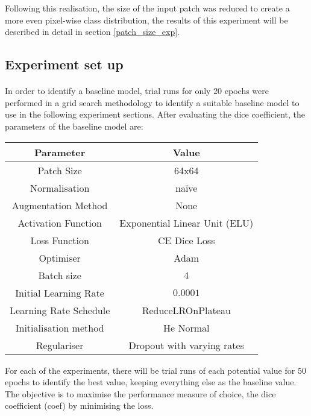 Following this realisation, the size of the input patch was reduced to create a more even pixel-wise class distribution, the results of this experiment will be described in detail in section \ref{patch_size_exp}.

\subsection{Experiment set up}
\paragraph{}
In order to identify a baseline model, trial runs for only 20 epochs were performed in a grid search methodology to identify a suitable baseline model to use in the following experiment sections. After evaluating the dice coefficient, the parameters of the baseline model are:

\begin{center}
    \begin{tabular}{c|c}     
    \textbf{Parameter} & \textbf{Value}  \\
    \hline
    Patch Size
    &  64x64 \\
    \hline
    Normalisation
    & na\"ive \\
    \hline
    Augmentation Method
    &  None \\
    \hline
    Activation Function
    &  Exponential Linear Unit (ELU) \\
    \hline
    Loss Function
    &  CE Dice Loss\\
    \hline
    Optimiser
    &  Adam \\
    \hline
    Batch size
    &  $4$ \\
    \hline
    Initial Learning Rate
    &  $0.0001$  \\
    \hline
    Learning Rate Schedule
    &  ReduceLROnPlateau  \\
    \hline
    Initialisation method
    &  He Normal  \\
    \hline
    Regulariser
    &  Dropout with varying rates \\
    \end{tabular}
\end{center}

For each of the experiments, there will be trial runs of each potential value for $50$ epochs to identify the best value, keeping everything else as the baseline value. The objective is to maximise the performance measure of choice, the dice coefficient (coef) by minimising the loss.
